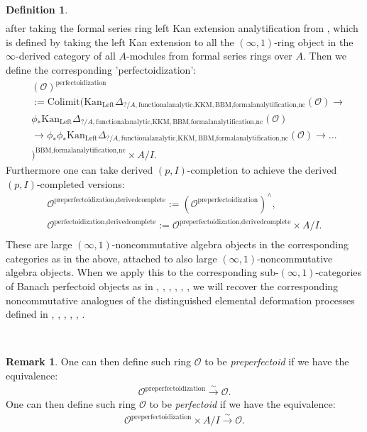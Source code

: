 \documentclass[11pt]{book}
\theoremstyle{definition}
\newtheorem{definition}[theorem]{Definition}
\newtheorem{remark}[theorem]{Remark}
\numberwithin{equation}{section}
\begin{document}
\begin{definition}
\begin{align}
\end{align}
after taking the formal series ring left Kan extension analytification from \cite[Section 4.2]{BBM}, which is defined by taking the left Kan extension to all the $(\infty,1)$-ring object in the $\infty$-derived category of all $A$-modules from formal series rings over $A$. Then we define the corresponding 'perfectoidization':
\begin{align}
&(\mathcal{O})^{\text{perfectoidization}}\\
&:=\mathrm{Colimit}(\mathrm{Kan}_{\mathrm{Left}}\Delta_{?/A,\text{functionalanalytic,KKM},\text{BBM,formalanalytification,nc}}(\mathcal{O})\longrightarrow \\
&\phi_*\mathrm{Kan}_{\mathrm{Left}}\Delta_{?/A,\text{functionalanalytic,KKM},\text{BBM,formalanalytification,nc}}(\mathcal{O})\\
&\longrightarrow \phi_* \phi_*\mathrm{Kan}_{\mathrm{Left}}\Delta_{?/A,\text{functionalanalytic,KKM},\text{BBM,formalanalytification,nc}}(\mathcal{O})\longrightarrow...\\
&)^{\text{BBM,formalanalytification,nc}}\times A/I.	
\end{align}
Furthermore one can take derived $(p,I)$-completion to achieve the derived $(p,I)$-completed versions:
\begin{align}
\mathcal{O}^\text{preperfectoidization,derivedcomplete}:=(\mathcal{O}^\text{preperfectoidization})^{\wedge},\\
\mathcal{O}^\text{perfectoidization,derivedcomplete}:=\mathcal{O}^\text{preperfectoidization,derivedcomplete}\times A/I.\\
\end{align}
These are large $(\infty,1)$-noncommutative algebra objects in the corresponding categories as in the above, attached to also large $(\infty,1)$-noncommutative algebra objects. When we apply this to the corresponding sub-$(\infty,1)$-categories of Banach perfectoid objects as in \cite{BMS2}, \cite{GR}, \cite{12KL1}, \cite{12KL2}, \cite{12Ked1}, \cite{12Sch3},  we will recover the corresponding noncommutative analogues of the distinguished elemental deformation processes defined in \cite{BMS2}, \cite{GR}, \cite{12KL1}, \cite{12KL2}, \cite{12Ked1}, \cite{12Sch3}.
\end{definition}

\

\begin{remark}
One can then define such ring $\mathcal{O}$ to be \textit{preperfectoid} if we have the equivalence:
\begin{align}
\mathcal{O}^{\text{preperfectoidization}} \overset{\sim}{\longrightarrow}	\mathcal{O}.
\end{align}
One can then define such ring $\mathcal{O}$ to be \textit{perfectoid} if we have the equivalence:
\begin{align}
\mathcal{O}^{\text{preperfectoidization}}\times A/I \overset{\sim}{\longrightarrow}	\mathcal{O}.
\end{align}
	
\end{remark}
\end{document}
